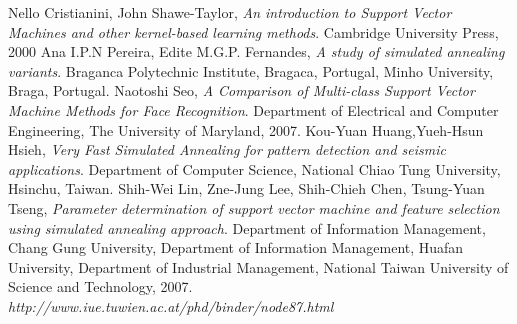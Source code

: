 \documentclass{article}
\begin{document}
\pagebreak
\begin{thebibliography}{9}
Nello Cristianini, John Shawe-Taylor, \emph{An introduction to Support Vector Machines and other kernel-based learning methods}.
Cambridge University Press,
2000
Ana I.P.N Pereira, Edite M.G.P. Fernandes, \emph{A study of simulated annealing variants}.
Braganca Polytechnic Institute, Bragaca, Portugal,
Minho University, Braga, Portugal.
Naotoshi Seo, \emph{A Comparison of Multi-class Support Vector Machine Methods for Face Recognition}. 
Department of Electrical and Computer Engineering, The University of Maryland, 
2007.
Kou-Yuan Huang,Yueh-Hsun Hsieh, \emph{Very Fast Simulated Annealing for pattern detection and seismic applications}. Department of Computer Science, National Chiao Tung University, Hsinchu, Taiwan.
Shih-Wei Lin, Zne-Jung Lee, Shih-Chieh Chen, Tsung-Yuan Tseng, \emph{Parameter determination of support vector machine and feature selection using simulated annealing approach}. Department of Information Management, Chang Gung University, Department of Information Management, Huafan University, Department of Industrial Management, National Taiwan University of Science and Technology, 2007.
\emph{http://www.iue.tuwien.ac.at/phd/binder/node87.html}
\end{thebibliography}
\end{document}
